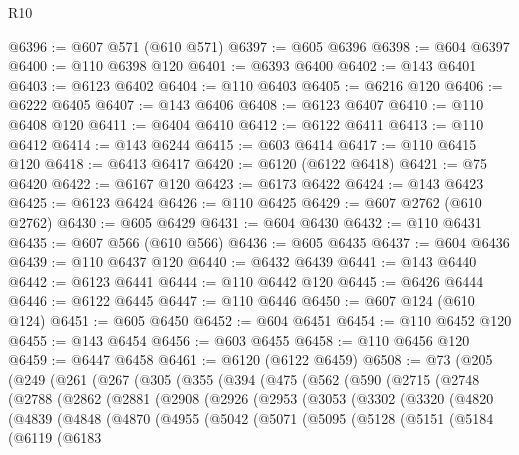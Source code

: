 \begin{lexlean}{R10}
\begin{coremodule}
@6396 := @607 @571 (@610 @571)
@6397 := @605 @6396
@6398 := @604 @6397
@6400 := @110 @6398 @120
@6401 := @6393 @6400
@6402 := @143 @6401
@6403 := @6123 @6402
@6404 := @110 @6403
@6405 := @6216 @120
@6406 := @6222 @6405
@6407 := @143 @6406
@6408 := @6123 @6407
@6410 := @110 @6408 @120
@6411 := @6404 @6410
@6412 := @6122 @6411
@6413 := @110 @6412
@6414 := @143 @6244
@6415 := @603 @6414
@6417 := @110 @6415 @120
@6418 := @6413 @6417
@6420 := @6120 (@6122 @6418)
@6421 := @75 @6420
@6422 := @6167 @120
@6423 := @6173 @6422
@6424 := @143 @6423
@6425 := @6123 @6424
@6426 := @110 @6425
@6429 := @607 @2762 (@610 @2762)
@6430 := @605 @6429
@6431 := @604 @6430
@6432 := @110 @6431
@6435 := @607 @566 (@610 @566)
@6436 := @605 @6435
@6437 := @604 @6436
@6439 := @110 @6437 @120
@6440 := @6432 @6439
@6441 := @143 @6440
@6442 := @6123 @6441
@6444 := @110 @6442 @120
@6445 := @6426 @6444
@6446 := @6122 @6445
@6447 := @110 @6446
@6450 := @607 @124 (@610 @124)
@6451 := @605 @6450
@6452 := @604 @6451
@6454 := @110 @6452 @120
@6455 := @143 @6454
@6456 := @603 @6455
@6458 := @110 @6456 @120
@6459 := @6447 @6458
@6461 := @6120 (@6122 @6459)
@6508 := @73
    (@205
      (@249
        (@261
          (@267
            (@305
              (@355
                (@394
                  (@475
                    (@562
                      (@590
                        (@2715
                          (@2748
                            (@2788
                              (@2862
                                (@2881
                                  (@2908
                                    (@2926
                                      (@2953
                                        (@3053
                                          (@3302
                                            (@3320
                                              (@4820
                                                (@4839
                                                  (@4848
                                                    (@4870
                                                      (@4955
                                                        (@5042
                                                          (@5071
                                                            (@5095
                                                              (@5128
                                                                (@5151
                                                                  (@5184
                                                                    (@6119
                                                                      (@6183

\end{coremodule}
\end{lexlean}
